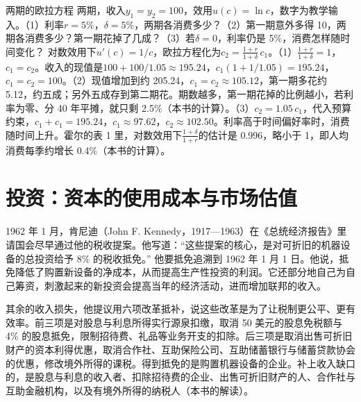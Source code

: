 \begin{example}{两期的欧拉方程}\label{ex:consumption-euler}
两期，收入$y_1=y_2=100$，效用$u(c)=\ln c$，数字为教学输入。（1）利率$r=5\%$，$\delta=5\%$，两期各消费多少？（2）第一期意外多得 10，两期各消费多少？第一期花掉了几成？（3）若$\delta=0$，利率仍是 5\%，消费怎样随时间变化？
\solution
对数效用下$u'(c)=1/c$，欧拉方程化为$c_2=\frac{1+r}{1+\delta}\,c_1$。（1）$\frac{1+r}{1+\delta}=1$，$c_1=c_2$。收入的现值是$100+100/1.05\approx195.24$，$c_1(1+1/1.05)=195.24$，$c_1=c_2=100$。（2）现值增加到约 205.24，$c_1=c_2\approx105.12$，第一期多花约 5.12，约五成；另外五成存到第二期花。期数越多，第一期花掉的比例越小，若利率为零、分 40 年平摊，就只剩 2.5\%（本书的计算）。（3）$c_2=1.05\,c_1$，代入预算约束，$c_1+c_1=195.24$，$c_1\approx97.62$，$c_2\approx102.50$。利率高于时间偏好率时，消费随时间上升。霍尔的表 1 里，对数效用下$\frac{1+\delta}{1+r}$的估计是 0.996，略小于 1，即人均消费每季约增长 0.4\%（本书的计算）\cite{hall1978}。
\end{example}

\section{投资：资本的使用成本与市场估值}\label{sec:consumption-investment}

1962 年 1 月，肯尼迪（John F. Kennedy，1917—1963）在《总统经济报告》里请国会尽早通过他的税收提案\cite{erp1962,loc39}。他写道：“这些提案的核心，是对可折旧的机器设备的总投资给予 8\% 的税收抵免。”\cite{erp1962} 他要抵免追溯到 1962 年 1 月 1 日\cite{erp1962}。他说，抵免降低了购置新设备的净成本，从而提高生产性投资的利润\cite{erp1962}。它还部分地自己为自己筹资，刺激起来的新投资会提高当年的经济活动，进而增加联邦的收入\cite{erp1962}。

其余的收入损失，他提议用六项改革抵补，说这些改革是为了让税制更公平、更有效率\cite{erp1962}。前三项是对股息与利息所得实行源泉扣缴，取消 50 美元的股息免税额与 4\% 的股息抵免，限制招待费、礼品等业务开支的扣除\cite{erp1962}。后三项是取消出售可折旧财产的资本利得优惠，取消合作社、互助保险公司、互助储蓄银行与储蓄贷款协会的优惠，修改境外所得的课税\cite{erp1962}。得到抵免的是购置机器设备的企业。补上收入缺口的，是股息与利息的收入者、扣除招待费的企业、出售可折旧财产的人、合作社与互助金融机构，以及有境外所得的纳税人（本书的解读）。

